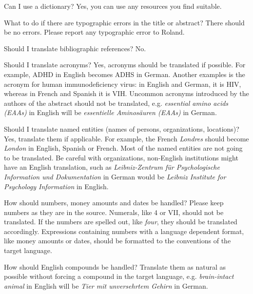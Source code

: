\documentclass[a4paper,10pt]{article}
\newenvironment{faq}{\begin{description}[style=nextline]}{\end{description}}
\newcommand{\cris}[1]{{\color{red}{#1}}}
\begin{document}
\begin{faq}

  \item[Can I use a dictionary?]
Yes, you can use any resources you find suitable.

  \item[What to do if there are typographic errors in the title or abstract?]
    There should be no errors. Please report any typographic error to Roland.

    
  \item[Should I translate bibliographic references?]
    No.
 
  \item[Should I translate acronyms?]
    Yes, acronyms should be translated if possible. For example, ADHD in English becomes ADHS in German. Another examples is the acronym for human immunodeficiency virus: in English and German, it is HIV, whereas in French and Spanish it is VIH.
    Uncommon acronyms introduced by the authors of the abstract should not be translated, e.g. \emph{essential amino acids (EAAs)} in English will be \emph{essentielle Aminos\"auren (EAAs)} in German. 

  \item[Should I translate named entities (names of persons, organizations, locations)?]
    Yes, translate them if applicable. For example, the French \textit{Londres} should become \textit{London} in English, Spanish or French. Most of the named entities are not going to be translated. Be careful with organizations, non-English institutions might have an English translation, such as \textit{Leibniz-Zentrum f\"ur Psychologische Information und Dokumentation} in German would be \textit{Leibniz Institute for Psychology Information} in English. 
  
\item[How should numbers, money amounts and dates be handled?]
 Please keep numbers as they are in the source. Numerals, like 4 or VII, should not be translated. If the numbers are spelled out, like \emph{four}, they should be translated accordingly. Expressions containing numbers with a language dependent format, like money amounts or dates, should be formatted to the conventions of the target language.
    
\item[How should English compounds be handled?]
Translate them as natural as possible without forcing a compound in the target language, e.g. \textit{brain-intact animal} in English will be \textit{Tier mit unversehrtem Gehirn} in German.
\end{faq}
\end{document}
